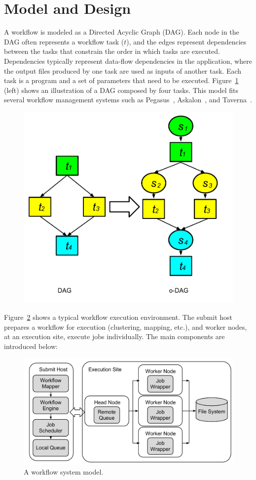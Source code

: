 \section{Model and Design}
\label{sec:model}


A workflow is modeled as a Directed Acyclic Graph (DAG). Each node in the DAG often represents a workflow task ($t$), and the edges represent dependencies between the tasks that constrain the order in which tasks are executed. Dependencies typically represent data-flow dependencies in the application, where the output files produced by one task are used as inputs of another task. Each task is a program and a set of parameters that need to be executed. Figure~\ref{fig:model_odag} (left) shows an illustration of a DAG composed by four tasks. This model fits several workflow management systems such as Pegasus~\cite{Deelman:2005:PFM:1239649.1239653}, Askalon~\cite{Fahringer:2005:ATS:1064323.1064331}, and Taverna~\cite{Oinn:2006:TLC:1148437.1148448}. 

\begin{figure}[htb]
	\centering
	\includegraphics[width=0.7\linewidth]{figures/model/odag_color.pdf}
	\label{fig:model_odag}
\end{figure}

Figure~\ref{fig:model_system} shows a typical workflow execution environment. The submit host prepares a workflow for execution (clustering, mapping, etc.), and worker nodes, at an execution site, execute jobs individually. The main components are introduced below:

\begin{figure}[htb]
\centering
  \includegraphics[width=0.95\linewidth]{figures/model/execution.pdf}
  \caption{A workflow system model.}
  \label{fig:model_system}
\end{figure}

